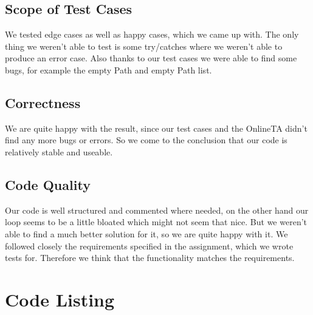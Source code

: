 \documentclass[12pt,a4paper]{article}
\begin{document}
\subsection{Scope of Test Cases}
We tested edge cases as well as happy cases, which we came up with.
The only thing we weren't able to test is some try/catches where we weren't able to produce an error case.
Also thanks to our test cases we were able to find some bugs, for example the empty Path and empty Path list.

\subsection{Correctness}
We are quite happy with the result, since our test cases and the OnlineTA didn't find any more bugs or errors.
So we come to the conclusion that our code is relatively stable and useable.

\subsection{Code Quality}
Our code is well structured and commented where needed, on the other hand our loop seems to be a little bloated which might not seem that nice. But we weren't able to find a much better solution for it, so we are quite happy with it.
We followed closely the requirements specified in the assignment, which we wrote tests for. Therefore we think that the functionality matches the requirements.


\appendix
\section{Code Listing}
\inputminted{erlang}{handin/src/flamingo.erl}
\inputminted{erlang}{handin/src/counter.erl}
\inputminted{erlang}{handin/src/mood.erl}
\inputminted{erlang}{handin/src/hello.erl}
\end{document}
